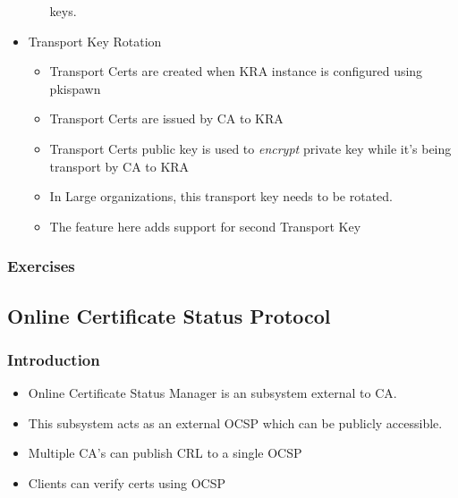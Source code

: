 \documentclass[a4paper]{article}
\begin{document}
\begin{itemize}
\begin{itemize}
                keys.
        \end{itemize}
    \item Transport Key Rotation
        \begin{itemize}
            \item Transport Certs are created when KRA instance is configured using pkispawn
            \item Transport Certs are issued by CA to KRA
            \item Transport Certs public key is used to \textit{encrypt} private key while it's being
                transport by CA to KRA 
            \item In Large organizations, this transport key needs to be rotated. 
            \item The feature here adds support for second Transport Key 
        \end{itemize}
\end{itemize}
\subsubsection{Exercises}
\subsection{Online Certificate Status Protocol}
\subsubsection{Introduction}
    \begin{itemize}
        \item Online Certificate Status Manager is an subsystem external to CA.
        \item This subsystem acts as an external OCSP which can be publicly accessible.
        \item Multiple CA's can publish CRL to a single OCSP 
        \item Clients can verify certs using OCSP 
    \end{itemize}
\end{document}
